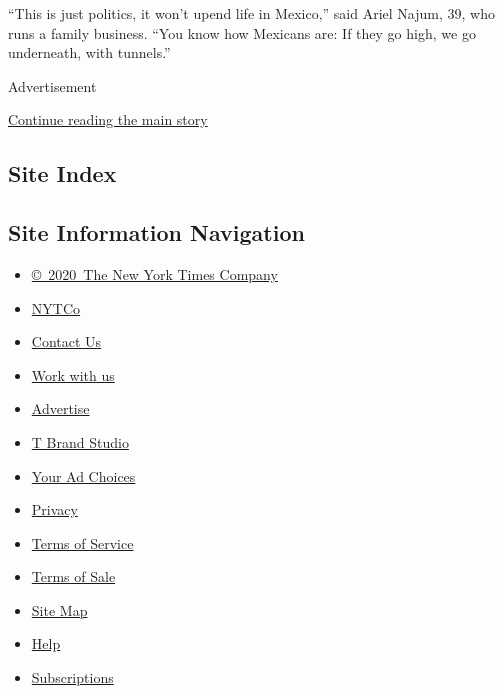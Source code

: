 ``This is just politics, it won't upend life in Mexico,'' said Ariel
Najum, 39, who runs a family business. ``You know how Mexicans are: If
they go high, we go underneath, with tunnels.''

Advertisement

\protect\hyperlink{after-bottom}{Continue reading the main story}

\hypertarget{site-index}{%
\subsection{Site Index}\label{site-index}}

\hypertarget{site-information-navigation}{%
\subsection{Site Information
Navigation}\label{site-information-navigation}}

\begin{itemize}
\tightlist
\item
  \href{https://help.nytimes.com/hc/en-us/articles/115014792127-Copyright-notice}{©~2020~The
  New York Times Company}
\end{itemize}

\begin{itemize}
\tightlist
\item
  \href{https://www.nytco.com/}{NYTCo}
\item
  \href{https://help.nytimes.com/hc/en-us/articles/115015385887-Contact-Us}{Contact
  Us}
\item
  \href{https://www.nytco.com/careers/}{Work with us}
\item
  \href{https://nytmediakit.com/}{Advertise}
\item
  \href{http://www.tbrandstudio.com/}{T Brand Studio}
\item
  \href{https://www.nytimes.com/privacy/cookie-policy\#how-do-i-manage-trackers}{Your
  Ad Choices}
\item
  \href{https://www.nytimes.com/privacy}{Privacy}
\item
  \href{https://help.nytimes.com/hc/en-us/articles/115014893428-Terms-of-service}{Terms
  of Service}
\item
  \href{https://help.nytimes.com/hc/en-us/articles/115014893968-Terms-of-sale}{Terms
  of Sale}
\item
  \href{https://spiderbites.nytimes.com}{Site Map}
\item
  \href{https://help.nytimes.com/hc/en-us}{Help}
\item
  \href{https://www.nytimes.com/subscription?campaignId=37WXW}{Subscriptions}
\end{itemize}
